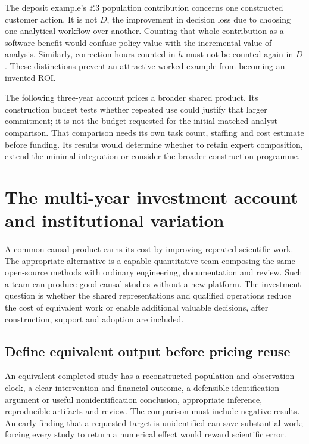 The deposit example's \pounds3 population contribution concerns one
constructed customer action. It is not $D$, the improvement in decision
loss due to choosing one analytical workflow over another. Counting
that whole contribution as a software benefit would confuse policy value
with the incremental value of analysis. Similarly, correction hours
counted in $h$ must not be counted again in $D$. These distinctions
prevent an attractive worked example from becoming an invented ROI.

The following three-year account prices a broader shared product. Its
construction budget tests whether repeated use could justify that larger
commitment; it is not the budget requested for the initial matched analyst
comparison. That comparison needs its own task count, staffing and cost
estimate before funding. Its results would determine whether to retain
expert composition, extend the minimal integration or consider the broader
construction programme.



\section{The multi-year investment account and institutional variation}
\label{r3:investment}

A common causal product earns its cost by improving repeated scientific
work. The appropriate alternative is a capable quantitative team composing
the same open-source methods with ordinary engineering, documentation and
review. Such a team can produce good causal studies without a new platform.
The investment question is whether the shared representations and qualified
operations reduce the cost of equivalent work or enable additional valuable
decisions, after construction, support and adoption are included.

\subsection{Define equivalent output before pricing reuse}
\label{r3:equivalent-output}

An equivalent completed study has a reconstructed population and observation
clock, a clear intervention and financial outcome, a defensible identification
argument or useful nonidentification conclusion, appropriate inference,
reproducible artifacts and review. The comparison must include negative
results. An early finding that a requested target is unidentified can save
substantial work; forcing every study to return a numerical effect would
reward scientific error.

